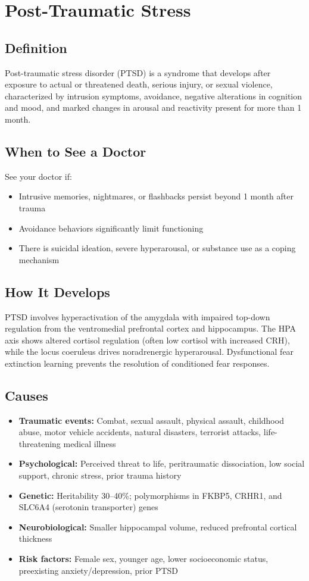 \chapter{Post-Traumatic Stress}

\section*{Definition}
Post-traumatic stress disorder (PTSD) is a syndrome that develops after exposure to actual or threatened death, serious injury, or sexual violence, characterized by intrusion symptoms, avoidance, negative alterations in cognition and mood, and marked changes in arousal and reactivity present for more than 1 month.

\section*{When to See a Doctor}
See your doctor if:
\begin{itemize}
  \item Intrusive memories, nightmares, or flashbacks persist beyond 1 month after trauma
  \item Avoidance behaviors significantly limit functioning
  \item There is suicidal ideation, severe hyperarousal, or substance use as a coping mechanism
\end{itemize}

\section*{How It Develops}
PTSD involves hyperactivation of the amygdala with impaired top-down regulation from the ventromedial prefrontal cortex and hippocampus. The HPA axis shows altered cortisol regulation (often low cortisol with increased CRH), while the locus coeruleus drives noradrenergic hyperarousal. Dysfunctional fear extinction learning prevents the resolution of conditioned fear responses.

\section*{Causes}
\begin{itemize}
  \item \textbf{Traumatic events:} Combat, sexual assault, physical assault, childhood abuse, motor vehicle accidents, natural disasters, terrorist attacks, life-threatening medical illness
  \item \textbf{Psychological:} Perceived threat to life, peritraumatic dissociation, low social support, chronic stress, prior trauma history
  \item \textbf{Genetic:} Heritability 30--40\%; polymorphisms in FKBP5, CRHR1, and SLC6A4 (serotonin transporter) genes
  \item \textbf{Neurobiological:} Smaller hippocampal volume, reduced prefrontal cortical thickness
  \item \textbf{Risk factors:} Female sex, younger age, lower socioeconomic status, preexisting anxiety/depression, prior PTSD
\end{itemize}

